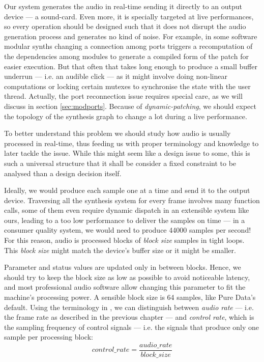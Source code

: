 Our system generates the audio in real-time sending
it directly to an output device --- a sound-card. Even more, it is
specially targeted at live performances, so every operation should be
designed such that it does not disrupt the audio generation process
and generates no kind of noise. For example, in some software modular
synths changing a connection among ports triggers a recomputation of
the dependencies among modules to generate a compiled form of the
patch for easier execution. But that often that takes long enough to
produce a small buffer underrun --- i.e. an audible
click --- as it might involve doing non-linear computations or locking
certain mutexes to synchronise the state with the user
thread. Actually, the port reconnection issue requires special care,
as we will discuss in section \ref{sec:modports}. Because of
\emph{dynamic-patching}, we should expect the
topology of the synthesis graph to change a lot during a live
performance.

To better understand this problem we should study how audio is
usually processed in real-time, thus feeding us with proper
terminology and knowledge to later tackle the issue. While this might
seem like a design issue to some, this is such a universal structure
that it shall be consider a fixed constraint to be analysed than a
design decision itself.

Ideally, we would produce each sample one at a time and send it to the
output device.  Traversing all the synthesis system for every frame
involves many function calls, some of them even require dynamic
dispatch in an extensible system like ours, leading to a too low
performance to deliver the samples on time --- in a consumer quality
system, we would need to produce 44000 samples per second! For this
reason, audio is processed blocks of \emph{block size} samples in
tight loops. This \emph{block size} might match the
device's buffer size or it might be
smaller. 

Parameter and status values are updated only in between blocks. Hence,
we should try to keep the block size as low as possible to avoid
noticeable latency, and most professional audio software allow
changing this parameter to fit the machine's processing power. A
sensible block size is 64 samples, like Pure Data's default. Using the
terminology in \cite{boulanger10audio}, we can distinguish between
\emph{audio rate} --- i.e. the frame rate as
described in the previous chapter --- and \emph{control
  rate}, which is the sampling frequency of
control signals --- i.e. the signals that produce only one sample per
processing block:
\begin{equation}
  control\_rate = \frac{audio\_rate}{block\_size}  
\end{equation}

